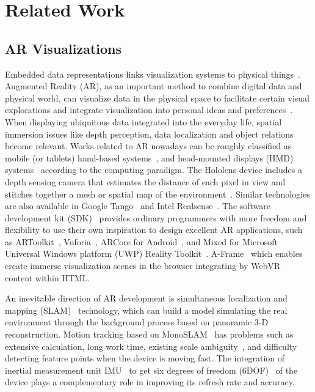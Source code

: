 \section{Related Work}
\subsection{AR Visualizations}

Embedded data representations links visualization systems to physical things~\cite{Willett2017}.
Augmented Reality (AR), as an important method to combine digital data and physical world,
can visualize data in the physical space to facilitate certain visual explorations and integrate visualization into personal ideas and preferences~\cite{Butscher2018}.
When displaying ubiquitous data integrated into the everyday life,
spatial immersion issues like depth perception, data localization and object relations become relevant.
Works related to AR nowadays can be roughly classified as mobile (or tablets) hand-based systems~\cite{ElSayed2015},
and head-mounted displays (HMD) systems~\cite{Herr2017} according to the computing paradigm.
The Hololens device includes a depth sensing camera that estimates the
distance of each pixel in view and stitches together a mesh
or spatial map
of the environment~\cite{Evans2017}.
Similar technologies are also available in Google Tango~\cite{MarderEppstein2016} and Intel Realsense~\cite{Keselman2017}.
The software development kit (SDK)~\cite{Amin2015} provides ordinary programmers
with more freedom and flexibility
to use their own inspiration to design excellent AR applications,
such as ARToolkit~\cite{Wagner2003, Hirokazu2002},
Vuforia~\cite{Cushnan2013},
ARCore for Android~\cite{ArCore},
and Mixed for Microsoft Universal Windows platform (UWP) Reality Toolkit~\cite{Liberty2018}.
A-Frame~\cite{aframe} which enables create immerse visualization scenes in the browser integrating by WebVR~\cite{webvr} content within HTML.

An inevitable direction of AR development is simultaneous localization and mapping
(SLAM)~\cite{Davison2003} technology, which can build a model simulating the real environment through the background process based on panoramic 3-D reconstruction.
Motion tracking based on MonoSLAM~\cite{Davison2007} has problems such as extensive calculation,
long work time, existing scale ambiguity~\cite{Davison2007}, and difficulty detecting feature points when the device is moving fast.
The integration of inertial measurement unit IMU~\cite{Jones2011} to get six degrees of freedom (6DOF)~\cite{Leutenegger2015} of the device
plays a complementary role in improving its refresh rate and accuracy.

